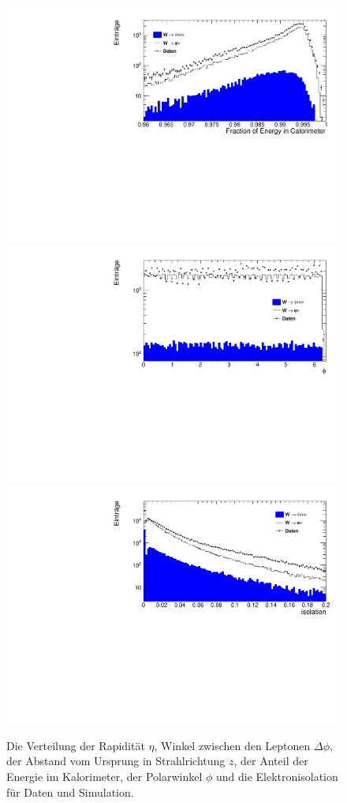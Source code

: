 \documentclass[a4paper,12pt]{article}
\begin{document}
\begin{figure}[h]
	\includegraphics[width=\halftext]{manualplots/energyFraction.pdf}\\
	\includegraphics[width=\halftext]{manualplots/phi.pdf}
	\includegraphics[width=\halftext]{manualplots/isolation.pdf}\\
	\caption{Die Verteilung der Rapidität $η$, Winkel zwischen den Leptonen $Δ\phi$, der Abstand vom Ursprung in
	Strahlrichtung $z$, der Anteil der Energie im Kalorimeter, der Polarwinkel $\phi$ und die
	Elektronisolation für Daten und Simulation. }
	\label{fig:variables}
\end{figure}
\end{document}
